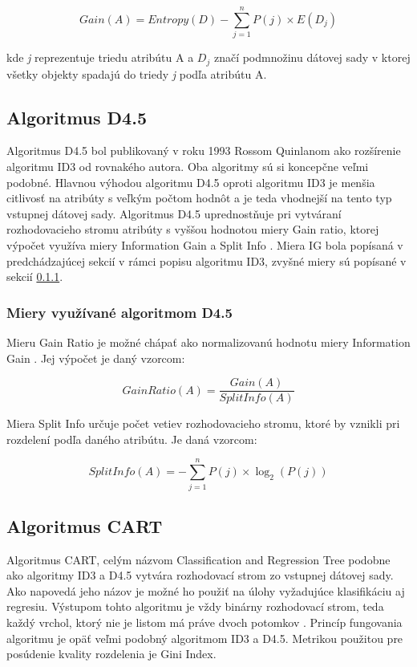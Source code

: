 \documentclass[slovak, master]{diploma}
\begin{document}
\[Gain(A) = Entropy(D) - \displaystyle\sum\limits_{j=1}^n P(j) \times E(D_j)\]

kde \textit{j} reprezentuje triedu atribútu A a $D_j$ značí podmnožinu dátovej sady v ktorej všetky objekty spadajú do triedy \textit{j} podľa atribútu A.

\subsection{Algoritmus D4.5}
\label{sec:D45}
Algoritmus D4.5 bol publikovaný v roku 1993 Rossom Quinlanom ako rozšírenie algoritmu ID3 od rovnakého autora. Oba algoritmy sú si koncepčne veľmi podobné. Hlavnou výhodou algoritmu D4.5 oproti algoritmu ID3 je menšia citlivosť na atribúty s veľkým počtom hodnôt a je teda vhodnejší na tento typ vstupnej dátovej sady. Algoritmus D4.5 uprednostňuje pri vytváraní rozhodovacieho stromu atribúty s vyššou hodnotou miery Gain ratio, ktorej výpočet využíva miery Information Gain a Split Info \cite{hssina2014comparative}. Miera IG bola popísaná v predchádzajúcej sekcií v rámci popisu algoritmu ID3, zvyšné miery sú popísané v sekcií \ref{sec:D45miery}.

\subsubsection{Miery využívané algoritmom D4.5}
\label{sec:D45miery}
Mieru Gain Ratio je možné chápať ako normalizovanú hodnotu miery Information Gain \cite{hssina2014comparative}. Jej výpočet je daný vzorcom:

\[GainRatio(A) = \frac{Gain(A)}{SplitInfo(A)}\]

Miera Split Info určuje počet vetiev rozhodovacieho stromu, ktoré by vznikli pri rozdelení podľa daného atribútu. Je daná vzorcom:

\[SplitInfo(A) = - \displaystyle\sum\limits_{j=1}^n P(j) \times \log_2(P(j))\]

\subsection{Algoritmus CART}
\label{sec:CART}
Algoritmus CART, celým názvom Classification and Regression Tree podobne ako algoritmy ID3 a D4.5 vytvára rozhodovací strom zo vstupnej dátovej sady. Ako napovedá jeho názov je možné ho použiť na úlohy vyžadujúce klasifikáciu aj regresiu. Výstupom tohto algoritmu je vždy binárny rozhodovací strom, teda každý vrchol, ktorý nie je listom má práve dvoch potomkov \cite{CART}. Princíp fungovania algoritmu je opäť veľmi podobný algoritmom ID3 a D4.5. Metrikou použitou pre posúdenie kvality rozdelenia je Gini Index.
\end{document}
